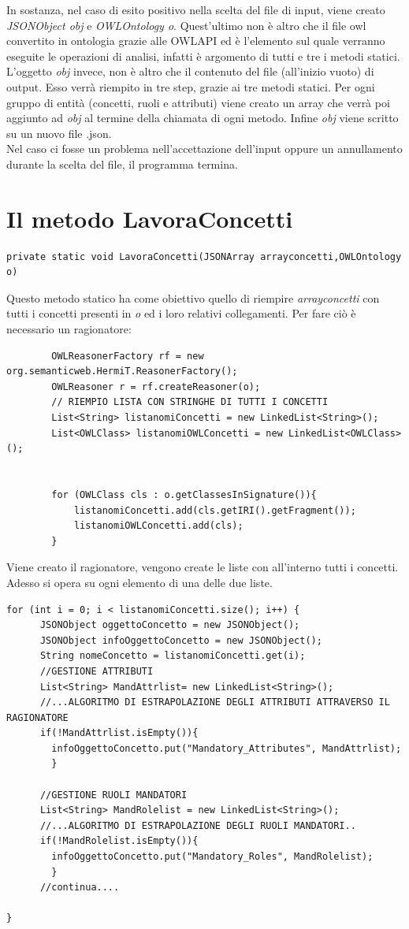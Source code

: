 \documentclass[Lau,binding=0.6cm]{sapthesis}
\begin{document}
In sostanza, nel caso di esito positivo nella scelta del file di input, viene creato \textit{JSONObject obj} e \textit{OWLOntology o}. Quest'ultimo non è altro che il file owl convertito in ontologia grazie alle OWLAPI ed è l'elemento sul quale verranno eseguite le operazioni di analisi, infatti è argomento di tutti e tre i metodi statici. L'oggetto \textit{obj} invece, non è altro che il contenuto del file (all'inizio vuoto) di output. Esso verrà riempito in tre step, grazie ai tre metodi statici. Per ogni gruppo di entità (concetti, ruoli e attributi) viene creato un array che verrà poi aggiunto ad \textit{obj} al termine della chiamata di ogni metodo. Infine \textit{obj} viene scritto su un nuovo file .json.
\\Nel caso ci fosse un problema nell'accettazione dell'input oppure un annullamento durante la scelta del file, il programma termina.

\section{Il metodo LavoraConcetti}
\begin{verbatim}
private static void LavoraConcetti(JSONArray arrayconcetti,OWLOntology o) 
\end{verbatim}
Questo metodo statico ha come obiettivo quello di riempire \textit{arrayconcetti} con tutti i concetti presenti in \textit{o} ed i loro relativi collegamenti.
Per fare ciò è necessario un ragionatore:
\begin{verbatim}
		OWLReasonerFactory rf = new org.semanticweb.HermiT.ReasonerFactory();
		OWLReasoner r = rf.createReasoner(o);
		// RIEMPIO LISTA CON STRINGHE DI TUTTI I CONCETTI       
		List<String> listanomiConcetti = new LinkedList<String>();
		List<OWLClass> listanomiOWLConcetti = new LinkedList<OWLClass>();
		
		
		for (OWLClass cls : o.getClassesInSignature()){
	     	listanomiConcetti.add(cls.getIRI().getFragment());
    	 	listanomiOWLConcetti.add(cls);                       
		}
\end{verbatim}
Viene creato il ragionatore, vengono create le liste con all'interno tutti i concetti. Adesso si opera su ogni elemento di una delle due liste.
\begin{verbatim}
for (int i = 0; i < listanomiConcetti.size(); i++) {
      JSONObject oggettoConcetto = new JSONObject();
      JSONObject infoOggettoConcetto = new JSONObject();
      String nomeConcetto = listanomiConcetti.get(i);
      //GESTIONE ATTRIBUTI
      List<String> MandAttrlist= new LinkedList<String>(); 
      //...ALGORITMO DI ESTRAPOLAZIONE DEGLI ATTRIBUTI ATTRAVERSO IL RAGIONATORE
      if(!MandAttrlist.isEmpty()){
      	infoOggettoConcetto.put("Mandatory_Attributes", MandAttrlist);
      	}
      
      //GESTIONE RUOLI MANDATORI
      List<String> MandRolelist = new LinkedList<String>();
      //...ALGORITMO DI ESTRAPOLAZIONE DEGLI RUOLI MANDATORI..
      if(!MandRolelist.isEmpty()){
      	infoOggettoConcetto.put("Mandatory_Roles", MandRolelist);
      	}
      //continua....	
      
}
\end{verbatim}
\end{document}
